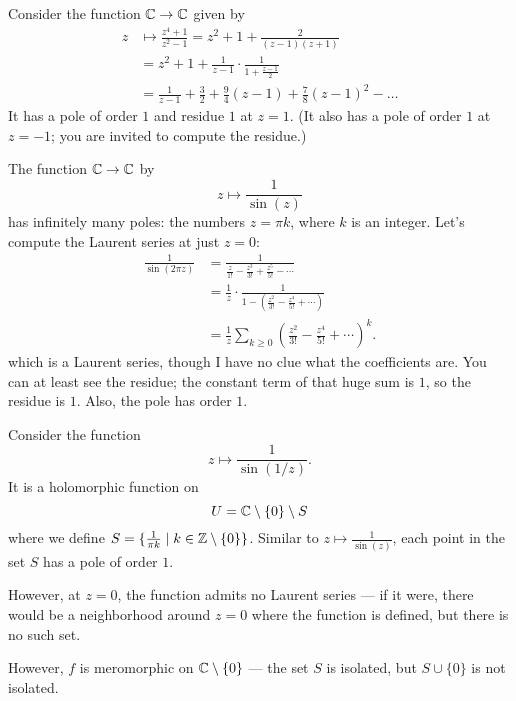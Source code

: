 \begin{example}
	Consider the function $\mathbb C \to \mathbb C$ given by
	\begin{align*}
		z &\mapsto \frac{z^4+1}{z^2-1} = z^2 + 1 + \frac{2}{(z-1)(z+1)} \\
		&= z^2 + 1 + \frac1{z-1} \cdot \frac{1}{1+\frac{z-1}{2}} \\
		&= \frac{1}{z-1} + \frac32 + \frac94(z-1) + \frac{7}{8}(z-1)^2 - \dots
	\end{align*}
	It has a pole of order $1$ and residue $1$ at $z=1$.
	(It also has a pole of order $1$ at $z=-1$; you are invited to compute the residue.)
\end{example}
\begin{example}
	The function $\mathbb C \to \mathbb C$ by \[ z \mapsto \frac{1}{\sin(z)} \]
	has infinitely many poles: the numbers $z = \pi k$, where $k$ is an integer.
	Let's compute the Laurent series at just $z=0$:
	\begin{align*}
		\frac{1}{\sin(2\pi z)}
		&= \frac{1}{\frac{z}{1!} - \frac{z^3}{3!} + \frac{z^5}{5!} - \dotsb} \\
		&= \frac 1z \cdot \frac{1}{1 - \left( \frac{z^2}{3!} - \frac{z^4}{5!} + \dotsb \right)} \\
		&= \frac 1z \sum_{k \ge 0} \left( \frac{z^2}{3!} - \frac{z^4}{5!} + \dotsb \right)^k.
	\end{align*}
	which is a Laurent series, though I have no clue what the coefficients are.
	You can at least see the residue; the constant term of that huge sum is $1$,
	so the residue is $1$.
	Also, the pole has order $1$.
\end{example}
\begin{example}
	Consider the function
	\[ z \mapsto \frac{1}{\sin(1/z)}. \]
	It is a holomorphic function on
	\[ U = \mathbb C \setminus \{ 0 \} \setminus S \]
	where we define $S = \{ \frac{1}{\pi k} \mid k \in \mathbb Z \setminus \{ 0 \} \}$.
	Similar to $z \mapsto \frac{1}{\sin(z)}$,
	each point in the set $S$ has a pole of order $1$.

	However, at $z = 0$, the function admits no Laurent series --- if it were, there would be a
	neighborhood around $z = 0$ where the function is defined, but there is no such set.

	However, $f$ is meromorphic on $\mathbb C \setminus \{ 0 \}$ --- the set $S$ is isolated, but $S \cup
	\{ 0 \}$ is not isolated.
\end{example}


